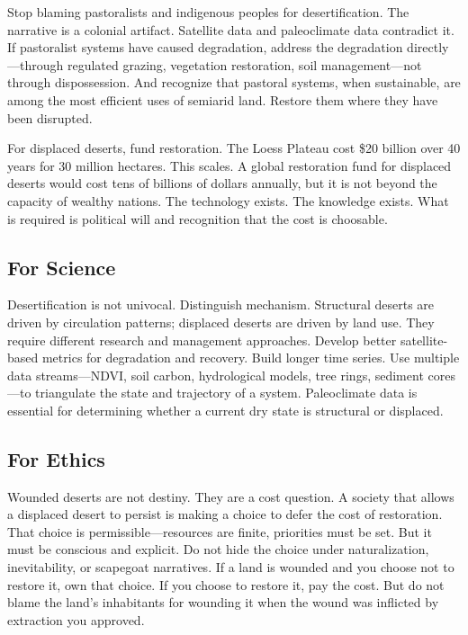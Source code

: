 \documentclass[12pt,a4paper]{article}
\begin{document}
Stop blaming pastoralists and indigenous peoples for desertification. The narrative is a colonial artifact. Satellite data and paleoclimate data contradict it. If pastoralist systems have caused degradation, address the degradation directly—through regulated grazing, vegetation restoration, soil management—not through dispossession. And recognize that pastoral systems, when sustainable, are among the most efficient uses of semiarid land. Restore them where they have been disrupted.

For displaced deserts, fund restoration. The Loess Plateau cost \$20 billion over 40 years for 30 million hectares. This scales. A global restoration fund for displaced deserts would cost tens of billions of dollars annually, but it is not beyond the capacity of wealthy nations. The technology exists. The knowledge exists. What is required is political will and recognition that the cost is choosable.

\subsection{For Science}

Desertification is not univocal. Distinguish mechanism. Structural deserts are driven by circulation patterns; displaced deserts are driven by land use. They require different research and management approaches. Develop better satellite-based metrics for degradation and recovery. Build longer time series. Use multiple data streams—NDVI, soil carbon, hydrological models, tree rings, sediment cores—to triangulate the state and trajectory of a system. Paleoclimate data is essential for determining whether a current dry state is structural or displaced.

\subsection{For Ethics}

Wounded deserts are not destiny. They are a cost question. A society that allows a displaced desert to persist is making a choice to defer the cost of restoration. That choice is permissible—resources are finite, priorities must be set. But it must be conscious and explicit. Do not hide the choice under naturalization, inevitability, or scapegoat narratives. If a land is wounded and you choose not to restore it, own that choice. If you choose to restore it, pay the cost. But do not blame the land's inhabitants for wounding it when the wound was inflicted by extraction you approved.
\end{document}
